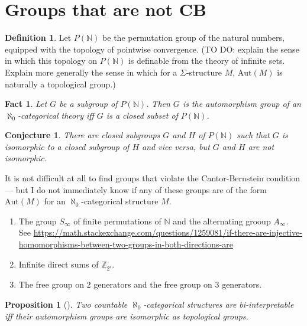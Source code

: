 \documentclass[12pt]{article}
\newtheorem*{conj}{Conjecture}
\newtheorem*{prop}{Proposition}
\newtheorem*{fact}{Fact}
\theoremstyle{definition}
\newtheorem*{defn}{Definition}
\begin{document}
\section{Groups that are not CB}

\begin{defn} Let $P(\mathbb{N})$ be the permutation group of the
  natural numbers, equipped with the topology of pointwise
  convergence. (TO DO: explain the sense in which this topology on
  $P(\mathbb{N})$ is definable from the theory of infinite
  sets. Explain more generally the sense in which for a
  $\Sigma$-structure $M$, $\mathrm{Aut}(M)$ is naturally a topological
  group.) \end{defn}

\begin{fact} Let $G$ be a subgroup of $P(\mathbb{N})$. Then $G$ is the
  automorphism group of an $\aleph _0$-categorical theory iff $G$ is
  a closed subset of $P(\mathbb{N})$. \end{fact}

\begin{conj} There are closed subgroups $G$ and $H$ of
  $P(\mathbb{N})$ such that $G$ is isomorphic to a closed subgroup of
  $H$ and vice versa, but $G$ and $H$ are not
  isomorphic. \end{conj}

It is not difficult at all to find groups that violate the
Cantor-Bernstein condition --- but I do not immediately know if any of
these groups are of the form $\mathrm{Aut}(M)$ for an
$\aleph _0$-categorical structure $M$.

\begin{enumerate}
\item The group $S_\infty$ of finite permutations of $\mathbb{N}$ and
  the alternating grooup $A_\infty$. See  \url{https://math.stackexchange.com/questions/1259081/if-there-are-injective-homomorphisms-between-two-groups-in-both-directions-are}
\item Infinite direct sums of $\mathbb{Z}_{2^i}$.
\item The free group on $2$ generators and the free group on $3$ generators.  
\end{enumerate}

\begin{prop}[\cite{ahlbrandt1986}] Two countable
  $\aleph _0$-categorical structures are bi-interpretable iff their
  automorphism groups are isomorphic as topological groups. \end{prop}
\end{document}
